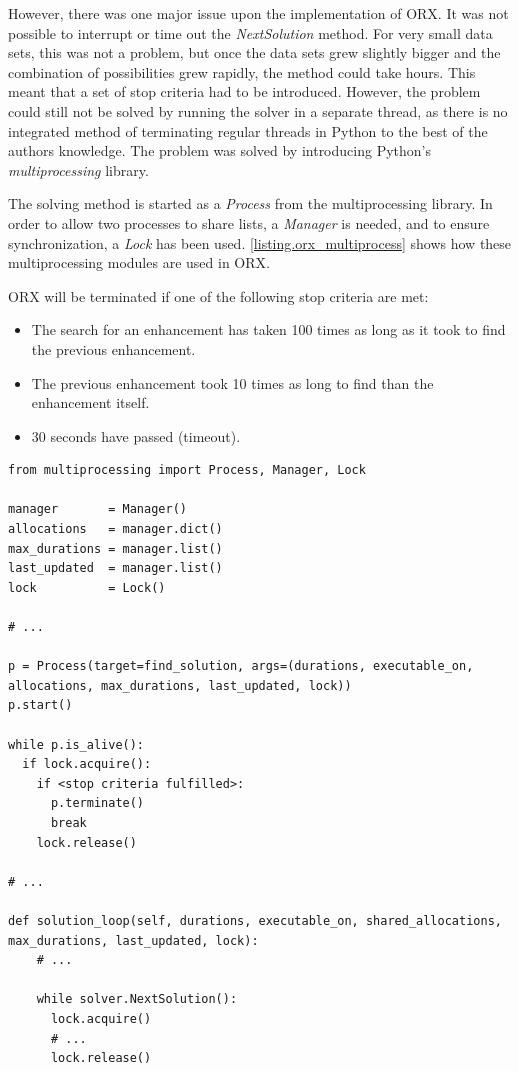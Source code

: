 However, there was one major issue upon the implementation of ORX. It was not possible to interrupt or time out the \emph{NextSolution} method. For very small data sets, this was not a problem, but once the data sets grew slightly bigger and the combination of possibilities grew rapidly, the method could take hours. This meant that a set of stop criteria had to be introduced. However, the problem could still not be solved by running the solver in a separate thread, as there is no integrated method of terminating regular threads in Python to the best of the authors knowledge. The problem was solved by introducing Python's \emph{multiprocessing} library.

The solving method is started as a \emph{Process} from the multiprocessing library. In order to allow two processes to share lists, a \emph{Manager} is needed, and to ensure synchronization, a \emph{Lock} has been used. \lstlistingname \space \ref{listing.orx_multiprocess} shows how these multiprocessing modules are used in ORX.

ORX will be terminated if one of the following stop criteria are met:

\begin{itemize}
    \item The search for an enhancement has taken 100 times as long as it took to find the previous enhancement.
    \item The previous enhancement took 10 times as long to find than the enhancement itself.
    \item 30 seconds have passed (timeout).
\end{itemize}

\vspace{4mm}
\begin{lstlisting}[caption=ORX Multiprocessing, label={listing.orx_multiprocess}]
from multiprocessing import Process, Manager, Lock

manager       = Manager()
allocations   = manager.dict()
max_durations = manager.list()
last_updated  = manager.list()
lock          = Lock()

# ...

p = Process(target=find_solution, args=(durations, executable_on, allocations, max_durations, last_updated, lock))
p.start()

while p.is_alive():
  if lock.acquire():
    if <stop criteria fulfilled>:
      p.terminate()
      break
    lock.release()

# ...

def solution_loop(self, durations, executable_on, shared_allocations, max_durations, last_updated, lock):
    # ...
    
    while solver.NextSolution():
      lock.acquire()
      # ...
      lock.release()
\end{lstlisting}







